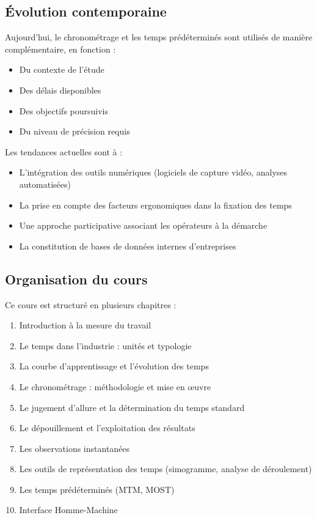 \documentclass[a4paper,12pt]{article}
\begin{document}
\subsection{Évolution contemporaine}

Aujourd'hui, le chronométrage et les temps prédéterminés sont utilisés de manière complémentaire, en fonction :

\begin{itemize}
    \item Du contexte de l'étude
    \item Des délais disponibles
    \item Des objectifs poursuivis
    \item Du niveau de précision requis
\end{itemize}

Les tendances actuelles sont à :
\begin{itemize}
    \item L'intégration des outils numériques (logiciels de capture vidéo, analyses automatisées)
    \item La prise en compte des facteurs ergonomiques dans la fixation des temps
    \item Une approche participative associant les opérateurs à la démarche
    \item La constitution de bases de données internes d'entreprises
\end{itemize}

\subsection{Organisation du cours}

Ce cours est structuré en plusieurs chapitres :

\begin{enumerate}
    \item Introduction à la mesure du travail
    \item Le temps dans l'industrie : unités et typologie
    \item La courbe d'apprentissage et l'évolution des temps
    \item Le chronométrage : méthodologie et mise en œuvre
    \item Le jugement d'allure et la détermination du temps standard
    \item Le dépouillement et l'exploitation des résultats
    \item Les observations instantanées
    \item Les outils de représentation des temps (simogramme, analyse de déroulement)
    \item Les temps prédéterminés (MTM, MOST)
    \item Interface Homme-Machine
\end{enumerate}
\end{document}
